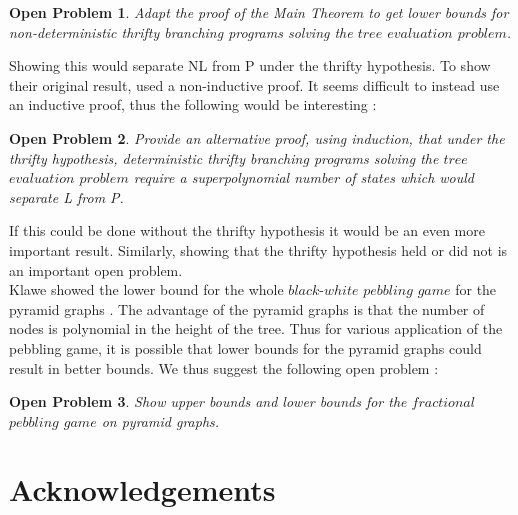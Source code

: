 \documentclass[12pt]{article}
\newtheorem{open}{Open Problem}
\begin{document}
\begin{open}
Adapt the proof of the Main Theorem to get lower bounds for non-deterministic thrifty branching programs solving the $tree$ $evaluation$ $problem$.
\end{open}

Showing this would separate NL from P under the thrifty hypothesis. To show their original result, \cite{c:pebjournal} used a non-inductive proof. It seems difficult to instead use an inductive proof, thus the following would be interesting :

\begin{open}
Provide an alternative proof, using induction, that under the thrifty hypothesis, deterministic thrifty branching programs solving the $tree$ $evaluation$ $problem$ require a superpolynomial number of states which would separate L from P. 
\end{open}

If this could be done without the thrifty hypothesis it would be an even more important result. Similarly, showing that the thrifty hypothesis held or did not is an important open problem.\\

Klawe showed the lower bound for the whole $black$-$white$ $pebbling$ $game$ for the pyramid graphs \cite{k:bwpyr}. The advantage of the pyramid graphs is that the number of nodes is polynomial in the height of the tree. Thus for various application of the pebbling game, it is possible that lower bounds for the pyramid graphs could result in better bounds. We thus suggest the following open problem :

\begin{open}
Show upper bounds and lower bounds for the $fractional $ $pebbling$ $game$ on pyramid graphs.
\end{open}




\newpage 


\section*{Acknowledgements} 




\newpage



\end{document}
